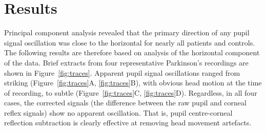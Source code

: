 \documentclass[jou,a4paper]{apa6}
\begin{document}
\section{Results}
Principal component analysis revealed that the primary direction of any pupil signal oscillation was close to the horizontal for nearly all patients and controls. The following results are therefore based on analysis of the horizontal component of the data. Brief extracts from four representative Parkinson's recordings are shown in Figure~\ref{fig:traces}. Apparent pupil signal oscillations ranged from striking (Figure~\ref{fig:traces}A, \ref{fig:traces}B), with obvious head motion at the time of recording, to subtle (Figure~\ref{fig:traces}C, \ref{fig:traces}D). Regardless, in all four cases, the corrected signals (the difference between the raw pupil and corneal reflex signals) show no apparent oscillation. That is, pupil centre-corneal reflection subtraction is clearly effective at removing head movement artefacts.
\end{document}
